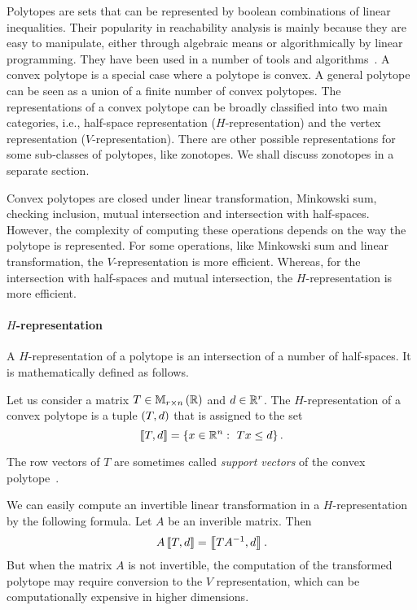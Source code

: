 Polytopes are sets that can be represented by boolean combinations of
linear inequalities.  Their popularity in reachability analysis is
mainly because they are easy to manipulate, either through algebraic
means or algorithmically by linear programming.  They have been used
in a number of tools and algorithms~\cite{todo}.  A convex polytope is
a special case where a polytope is convex.  A general polytope can be
seen as a union of a finite number of convex polytopes.  The
representations of a convex polytope can be broadly classified into
two main categories, i.e., half-space representation
($H$-representation) and the vertex representation
($V$-representation).  There are other possible representations for
some sub-classes of polytopes, like zonotopes.  We shall discuss
zonotopes in a separate section.

Convex polytopes are closed under linear transformation, Minkowski
sum, checking inclusion, mutual intersection and intersection with
half-spaces.  However, the complexity of computing these operations
depends on the way the polytope is represented.  For some operations,
like Minkowski sum and linear transformation, the $V$-representation
is more efficient.  Whereas, for the intersection with half-spaces and
mutual intersection, the $H$-representation is more efficient.

\paragraph*{$H$-representation}
A $H$-representation of a polytope is an intersection of a number of
half-spaces.  It is mathematically defined as follows.
%
\begin{definition}[$H$-representation]
Let us consider a matrix $T\in\mathbb{M}_{r\times n}\left(\mathbb{R}\right)$ and $d\in\mathbb{R}^r$.
The $H$-representation of a convex polytope is a tuple $\left(T,d\right)$
that is assigned to the set
%
\[
\left\llbracket T,d\right\rrbracket=\left\{x\in\mathbb{R}^n:~Tx\leq d\right\}.
\]
%
\end{definition}
%
The row vectors of $T$ are sometimes called \emph{support vectors} of
the convex polytope~\cite{todo}.

We can easily compute an invertible linear transformation in a
$H$-representation by the following formula.  Let $A$ be an inverible
matrix.  Then
%
\[
A\left\llbracket T,d\right\rrbracket=\left\llbracket TA^{-1},d\right\rrbracket.
\]
%
But when the matrix $A$ is not invertible, the computation of the
transformed polytope may require conversion to the $V$ representation,
which can be computationally expensive in higher dimensions.

